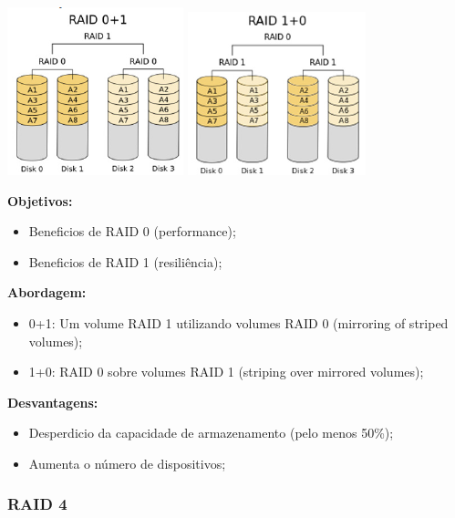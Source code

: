 \documentclass{article}
\begin{document}
\begin{center}
  \includegraphics[scale=0.6]{34}
  \includegraphics[scale=0.6]{35}
\end{center}

\begin{flushleft}
  \textbf{Objetivos:}
  \begin{itemize}
    \item Beneficios de RAID 0  (performance);
    \item Beneficios de RAID 1 (resiliência);
  \end{itemize}

  \textbf{Abordagem:}
  \begin{itemize}
    \item 0+1: Um volume RAID 1 utilizando volumes RAID 0 (mirroring of striped volumes);
    \item 1+0: RAID 0 sobre volumes RAID 1 (striping over mirrored volumes);
  \end{itemize}

  \textbf{Desvantagens:}
  \begin{itemize}
    \item Desperdicio da capacidade de armazenamento (pelo menos 50\%);
    \item Aumenta o número de dispositivos;
  \end{itemize}
\end{flushleft}

\subsubsection{RAID 4}
\end{document}
